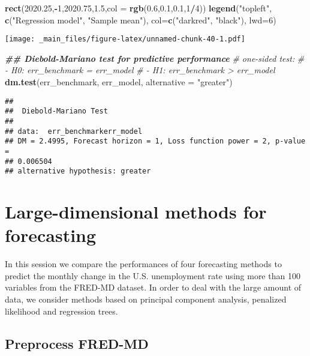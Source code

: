\documentclass[
]{book}
\newenvironment{Shaded}{\begin{snugshade}}{\end{snugshade}}
\newcommand{\AttributeTok}[1]{\textcolor[rgb]{0.13,0.29,0.53}{#1}}
\newcommand{\CommentTok}[1]{\textcolor[rgb]{0.56,0.35,0.01}{\textit{#1}}}
\newcommand{\DecValTok}[1]{\textcolor[rgb]{0.00,0.00,0.81}{#1}}
\newcommand{\DocumentationTok}[1]{\textcolor[rgb]{0.56,0.35,0.01}{\textbf{\textit{#1}}}}
\newcommand{\FloatTok}[1]{\textcolor[rgb]{0.00,0.00,0.81}{#1}}
\newcommand{\FunctionTok}[1]{\textcolor[rgb]{0.13,0.29,0.53}{\textbf{#1}}}
\newcommand{\NormalTok}[1]{#1}
\newcommand{\SpecialCharTok}[1]{\textcolor[rgb]{0.81,0.36,0.00}{\textbf{#1}}}
\newcommand{\StringTok}[1]{\textcolor[rgb]{0.31,0.60,0.02}{#1}}
\begin{document}
\begin{Shaded}
\begin{Highlighting}[]
\FunctionTok{rect}\NormalTok{(}\FloatTok{2020.25}\NormalTok{,}\SpecialCharTok{{-}}\DecValTok{1}\NormalTok{,}\FloatTok{2020.75}\NormalTok{,}\FloatTok{1.5}\NormalTok{,}\AttributeTok{col =} \FunctionTok{rgb}\NormalTok{(}\FloatTok{0.6}\NormalTok{,}\FloatTok{0.1}\NormalTok{,}\FloatTok{0.1}\NormalTok{,}\DecValTok{1}\SpecialCharTok{/}\DecValTok{4}\NormalTok{))}
\FunctionTok{legend}\NormalTok{(}\StringTok{"topleft"}\NormalTok{, }\FunctionTok{c}\NormalTok{(}\StringTok{"Regression model"}\NormalTok{, }\StringTok{"Sample mean"}\NormalTok{), }\AttributeTok{col=}\FunctionTok{c}\NormalTok{(}\StringTok{"darkred"}\NormalTok{, }\StringTok{"black"}\NormalTok{), }\AttributeTok{lwd=}\DecValTok{6}\NormalTok{)}
\end{Highlighting}
\end{Shaded}

\texttt{[image: \_main\_files/figure-latex/unnamed-chunk-40-1.pdf]}

\begin{Shaded}
\begin{Highlighting}[]
\DocumentationTok{\#\# Diebold{-}Mariano test for predictive performance}
\CommentTok{\# one{-}sided test: }
\CommentTok{\# {-} H0: err\_benchmark = err\_model}
\CommentTok{\# {-} H1: err\_benchmark \textgreater{} err\_model}
\FunctionTok{dm.test}\NormalTok{(err\_benchmark, err\_model, }\AttributeTok{alternative =} \StringTok{"greater"}\NormalTok{) }
\end{Highlighting}
\end{Shaded}

\begin{verbatim}
## 
##  Diebold-Mariano Test
## 
## data:  err_benchmarkerr_model
## DM = 2.4995, Forecast horizon = 1, Loss function power = 2, p-value =
## 0.006504
## alternative hypothesis: greater
\end{verbatim}

\hypertarget{session03}{%
\chapter{Large-dimensional methods for forecasting}\label{session03}}

In this session we compare the performances of four forecasting methods to predict the monthly change in the U.S. unemployment rate using more than 100 variables from the FRED-MD dataset. In order to deal with the large amount of data, we consider methods based on principal component analysis, penalized likelihood and regression trees.

\hypertarget{preprocess-fred-md}{%
\section{Preprocess FRED-MD}\label{preprocess-fred-md}}
\end{document}
